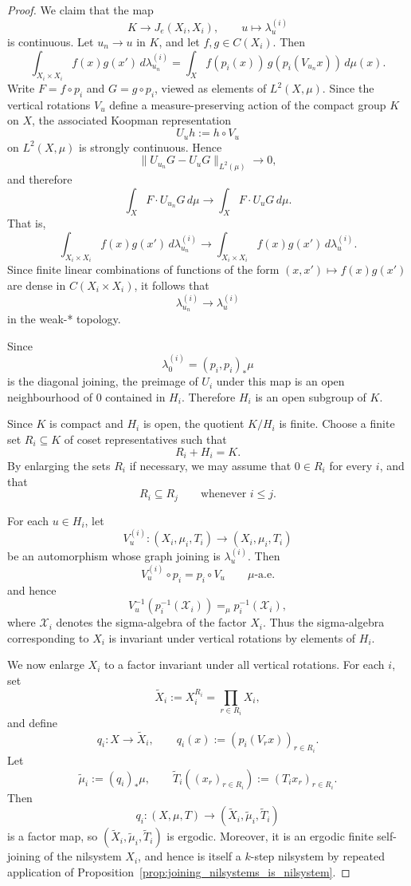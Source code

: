 \documentclass[10pt,a4paper]{amsart}
\begin{document}
\begin{proof}
    We claim that the map
\[
K \to J_e(X_i,X_i), \qquad u \mapsto \lambda_u^{(i)}
\]
is continuous.
Let $u_n \to u$ in $K$, and let $f,g \in C(X_i)$.
Then
\[
\int_{X_i\times X_i} f(x)g(x')\, d\lambda^{(i)}_{u_n}
=
\int_X f(p_i(x))\, g(p_i(V_{u_n}x))\, d\mu(x).
\]
Write $F = f\circ p_i$ and $G = g\circ p_i$, viewed as elements of $L^2(X,\mu)$.
Since the vertical rotations $V_u$ define a measure-preserving action of the compact group $K$ on $X$, the associated Koopman representation
\[
U_u h := h\circ V_u
\]
on $L^2(X,\mu)$ is strongly continuous.
Hence
\[
\|U_{u_n}G - U_uG\|_{L^2(\mu)} \to 0,
\]
and therefore
\[
\int_X F \cdot U_{u_n}G \, d\mu \to \int_X F \cdot U_uG \, d\mu.
\]
That is,
\[
\int_{X_i\times X_i} f(x)g(x')\, d\lambda^{(i)}_{u_n}
\to
\int_{X_i\times X_i} f(x)g(x')\, d\lambda^{(i)}_u.
\]
Since finite linear combinations of functions of the form $(x,x')\mapsto f(x)g(x')$ are dense in $C(X_i\times X_i)$, it follows that
\[
\lambda^{(i)}_{u_n} \to \lambda^{(i)}_u
\]
in the weak-* topology.

    Since
    \[
    \lambda_0^{(i)}=(p_i,p_i)_*\mu
    \]
    is the diagonal joining, the preimage of $U_i$ under this map is an open neighbourhood of $0$ contained in $H_i$.
    Therefore $H_i$ is an open subgroup of $K$.

    Since $K$ is compact and $H_i$ is open, the quotient $K/H_i$ is finite.
    Choose a finite set $R_i\subseteq K$ of coset representatives such that
    \[
    R_i+H_i=K.
    \]
    By enlarging the sets $R_i$ if necessary, we may assume that $0\in R_i$ for every $i$, and that
    \[
    R_i\subseteq R_j \qquad \text{whenever } i\leq j.
    \]

    For each $u\in H_i$, let
    \[
    V_u^{(i)}\colon (X_i,\mu_i,T_i)\to (X_i,\mu_i,T_i)
    \]
    be an automorphism whose graph joining is $\lambda_u^{(i)}$.
    Then
    \[
    V_u^{(i)}\circ p_i=p_i\circ V_u \qquad \mu\text{-a.e.}
    \]
    and hence
    \[
    V_u^{-1}(p_i^{-1}(\mathcal X_i)) =_\mu p_i^{-1}(\mathcal X_i),
    \]
    where $\mathcal X_i$ denotes the sigma-algebra of the factor $X_i$.
    Thus the sigma-algebra corresponding to $X_i$ is invariant under vertical rotations by elements of $H_i$.

    We now enlarge $X_i$ to a factor invariant under all vertical rotations.
    For each $i$, set
    \[
    \widetilde X_i:=X_i^{R_i}=\prod_{r\in R_i} X_i,
    \]
    and define
    \[
    q_i\colon X\to \widetilde X_i,\qquad
    q_i(x):=(p_i(V_r x))_{r\in R_i}.
    \]
    Let
    \[
    \widetilde\mu_i:=(q_i)_*\mu,
    \qquad
    \widetilde T_i((x_r)_{r\in R_i}):=(T_i x_r)_{r\in R_i}.
    \]
    Then
    \[
    q_i\colon (X,\mu,T)\to (\widetilde X_i,\widetilde\mu_i,\widetilde T_i)
    \]
    is a factor map, so $(\widetilde X_i,\widetilde\mu_i,\widetilde T_i)$ is ergodic.
    Moreover, it is an ergodic finite self-joining of the nilsystem $X_i$, and hence is itself a $k$-step nilsystem by repeated application of Proposition~\ref{prop:joining_nilsystems_is_nilsystem}.


\end{proof}
\end{document}
